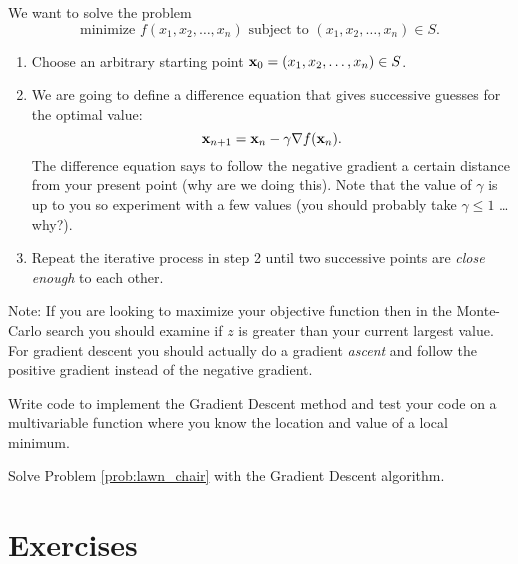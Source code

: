 \begin{algorithm}
    We want to solve the problem 
    \[ \text{minimize } f(x_1, x_2, \ldots, x_n) \text{ subject to }(x_1, x_2, \ldots, x_n) \in S. \]
    \begin{enumerate}
        \item Choose an arbitrary starting point ${\bf x}_0 = (x_1,x_2,\ldots,x_n)\in S$.
        \item We are going to define a difference equation that gives successive guesses
            for the optimal value:
            \[ {\bf x}_{n+1} = {\bf x}_n - \gamma \nabla f({\bf x}_n). \]
            The difference equation says to follow the negative gradient a certain
            distance from your present point (why are we doing this).  Note that the value
            of $\gamma$ is up to you so experiment with a few values (you should probably
            take $\gamma \le 1$ \ldots why?).
        \item Repeat the iterative process in step 2 until two successive points are {\it
            close enough} to each other.
    \end{enumerate}
\end{algorithm}
Note: If you are looking to maximize your objective function then in the Monte-Carlo
search you should examine if $z$ is greater than your current largest value.  For gradient
descent you should actually do a gradient {\it
ascent} and follow the positive gradient instead of the negative gradient.

\begin{problem}
    Write code to implement the Gradient Descent method and test your code on a
    multivariable function where you know the location and value of a local minimum.
\end{problem}

\begin{problem}
    Solve Problem \ref{prob:lawn_chair} with the Gradient Descent algorithm.
\end{problem}

\newpage\section{Exercises}

